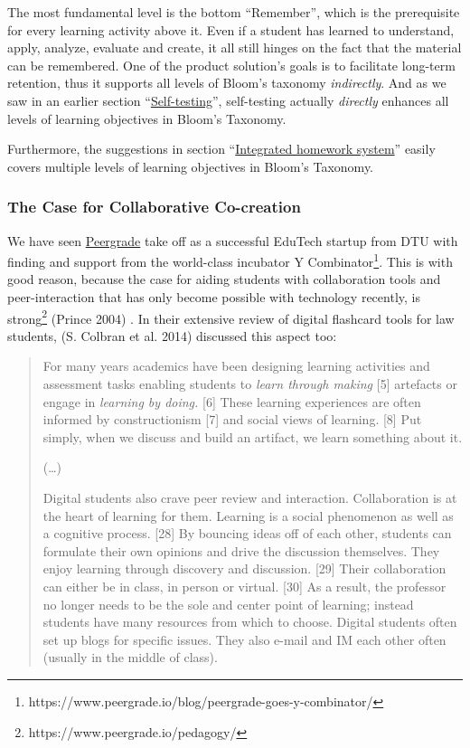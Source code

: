 The most fundamental level is the bottom ``Remember'', which is the
prerequisite for every learning activity above it. Even if a student has
learned to understand, apply, analyze, evaluate and create, it all still
hinges on the fact that the material can be remembered. One of the
product solution's goals is to facilitate long-term retention, thus it
supports all levels of Bloom's taxonomy \emph{indirectly}. And as we saw
in an earlier section
``\protect\hyperlink{self-testing}{Self-testing}'', self-testing
actually \emph{directly} enhances all levels of learning objectives in
Bloom's Taxonomy.

Furthermore, the suggestions in section
``\protect\hyperlink{integrated-homework-system}{Integrated homework
system}'' easily covers multiple levels of learning objectives in
Bloom's Taxonomy.

\subsubsection{The Case for Collaborative
Co-creation}\label{the-case-for-collaborative-co-creation}

We have seen \href{http://peergrade.io}{Peergrade} take off as a
successful EduTech startup from DTU with finding and support from the
world-class incubator Y Combinator\footnote{https://www.peergrade.io/blog/peergrade-goes-y-combinator/}.
This is with good reason, because the case for aiding students with
collaboration tools and peer-interaction that has only become possible
with technology recently, is strong\footnote{https://www.peergrade.io/pedagogy/}
(Prince 2004) . In their extensive review of digital flashcard tools for
law students, (S. Colbran et al. 2014) discussed this aspect too:

\begin{quote}
For many years academics have been designing learning activities and
assessment tasks enabling students to \emph{learn through making}
{[}5{]} artefacts or engage in \emph{learning by doing.} {[}6{]} These
learning experiences are often informed by constructionism {[}7{]} and
social views of learning. {[}8{]} Put simply, when we discuss and build
an artifact, we learn something about it.

(\ldots{})

Digital students also crave peer review and interaction. Collaboration
is at the heart of learning for them. Learning is a social phenomenon as
well as a cognitive process. {[}28{]} By bouncing ideas off of each
other, students can formulate their own opinions and drive the
discussion themselves. They enjoy learning through discovery and
discussion. {[}29{]} Their collaboration can either be in class, in
person or virtual. {[}30{]} As a result, the professor no longer needs
to be the sole and center point of learning; instead students have many
resources from which to choose. Digital students often set up blogs for
specific issues. They also e-mail and IM each other often (usually in
the middle of class).
\end{quote}

